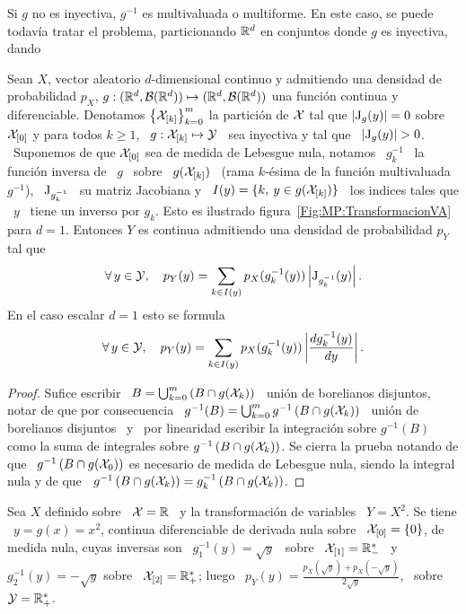 Si $g$ no es inyectiva, $g^{-1}$  es multivaluada o multiforme. En este caso, se
puede todav\'ia  tratar el problema, particionando $\mathbb{R}^d$  en conjuntos donde
$g$ es inyectiva, dando
%
\begin{teorema}
\label{Teo:MP:TransformacionNoInyectivaDensidad}
%
Sean $X$, vector aleatorio $d$-dimensional continuo y admitiendo una densidad de
probabilidad $p_X$, $g:(\mathbb{R}^d ,  \mathcal{B}(\mathbb{R}^d)) \mapsto (\mathbb{R}^d , \mathcal{B}(\mathbb{R}^d))$
una   funci\'on   continua  y   diferenciable.    Denotamos  $\left\{   \mathcal{X}_{[k]}
\right\}_{k=0}^m$ la partici\'on de $\mathcal{X}$  tal que $\left| \operatorname{J}_g(y) \right| = 0$
sobre  $\mathcal{X}_{[0]}$ y  para todos  $k \ge  1$, \  $g: \mathcal{X}_{[k]}  \mapsto \mathcal{Y}$  \ sea
inyectiva  y tal  que  \ $\left|  \operatorname{J}_g(y) \right|  >  0$. \  Suponemos de  que
$\mathcal{X}_{[0]}$ sea de  medida de Lebesgue nula, notamos \  $g_k^{-1}$ \ la funci\'on
inversa de  \ $g$ \  sobre \ $g(\mathcal{X}_{[k]})$  \ (rama $k$-\'esima de  la funci\'on
multivaluada $g^{-1}$), \ $\operatorname{J}_{g_k^{-1}}$ \ su matriz Jacobiana y \ $I(y) = \{
k, \: y \in g(\mathcal{X}_{[k]}) \}$ \ los indices tales que \ $y$ \ tiene un inverso por
$g_k$.   Esto es  ilustrado figura~\ref{Fig:MP:TransformacionVA}  para $d  = 1$.
Entonces $Y$ es continua admitiendo una densidad de probabilidad $p_Y$ tal que
  \[
  \forall  \, y  \in \mathcal{Y},  \quad p_Y(y)  = \sum_{k  \in  I(y)} p_X(g_k^{-1}(y))
  \left| \operatorname{J}_{g_k^{-1}}(y) \right|.
  \]
  En el caso escalar $d = 1$ esto se formula
  \[
  \forall \, y \in \mathcal{Y}, \quad  p_Y(y) = \sum_{k \in I(y)} p_X(g_k^{-1}(y)) \left|
    \frac{d g_k^{-1}(y)}{dy} \right|.
  \]
\end{teorema}
%
\begin{proof}
  Sufice escribir  \ $B  = \bigcup_{k =  0}^m \left(  B \cap g(\mathcal{X}_k)  \right)$ \
  uni\'on de borelianos disjuntos, notar  de que por consecuencia \ $g^{-1}(B) =
  \bigcup_{k =0}^m g^{-1}\left( B \cap  g(\mathcal{X}_k) \right)$ \ uni\'on de borelianos
  disjuntos \  y \  por linearidad escribir  la integraci\'on  sobre $g^{-1}(B)$
  como la  suma de  integrales sobre $g^{-1}\left(  B \cap g(\mathcal{X}_k)  \right)$. Se
  cierra la  prueba notando de  que \ $g^{-1}\left(  B \cap g(\mathcal{X}_0)  \right)$ es
  necesario  de medida de  Lebesgue nula,  siendo la  integral nula  y de  que \
  $g^{-1}\left( B \cap g(\mathcal{X}_k) \right) = g_k^{-1}\left( B \cap g(\mathcal{X}_k) \right)$.
\end{proof}
%

\begin{ejemplo}
\label{Ej:MP:TransformacionNoBiyectiva}
%
  Sea $X$ definido sobre  \ $\mathcal{X} = \mathbb{R}$ \ y la  transformaci\'on de variables \
  $Y = X^2$.   Se tiene \ $y  = g(x) = x^2$, continua  diferenciable de derivada
  nula  sobre \  $\mathcal{X}_{[0]} =  \{ 0  \}$, de  medida nula,  cuyas inversas  son \
  $g_1^{-1}(y) = \sqrt{y}$ \ sobre \ $\mathcal{X}_{[1]} = \mathbb{R}_-^*$ \ y \ $g_2^{-1}(y) =
  -   \sqrt{y}$  sobre   \   $\mathcal{X}_{[2]}   =  \mathbb{R}_+^*$;   luego   \  $p_Y(y)   =
  \frac{p_X(\sqrt{y})  +   p_X(-\sqrt{y})}{2  \sqrt{y}}$,   \  sobre  \   $\mathcal{Y}  =
  \mathbb{R}_+^*$.
\end{ejemplo}

